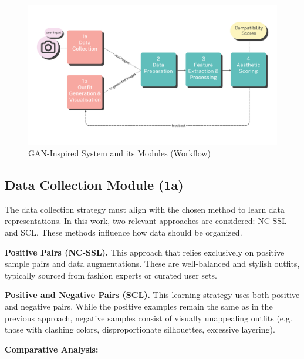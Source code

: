 \begin{figure}[h]
  \centering
  \includegraphics[width=\linewidth]{Abbildungen/workflow-modules.png}
  \caption{\acs{GAN}-Inspired System and its Modules (Workflow)}
  \label{fig:workflow-modules}
\end{figure}

\subsection{Data Collection Module (1a)}

The data collection strategy must align with the chosen method to learn data representations. In this work, two relevant approaches are considered: \acs{NC-SSL} and \acs{SCL}. These methods influence how data should be organized.

\vspace{0.5cm}

\textbf{Positive Pairs (\ac{NC-SSL}).}
This approach that relies exclusively on positive sample pairs and data augmentations. These are well-balanced and stylish outfits, typically sourced from fashion experts or curated user sets.

\vspace{0.5cm}

\textbf{Positive and Negative Pairs (\ac{SCL}).}
This learning strategy uses both positive and negative pairs. While the positive examples remain the same as in the previous approach, negative samples consist of visually unappealing outfits (e.g. those with clashing colors, disproportionate silhouettes, excessive layering).

\vspace{0.5cm}

\textbf{Comparative Analysis:}

\vspace{0.5cm}

